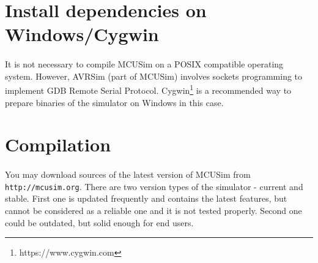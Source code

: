 \section{Install dependencies on Windows/Cygwin}
\paragraph{}
It is not necessary to compile MCUSim on a POSIX compatible operating system.
However, AVRSim (part of MCUSim) involves sockets programming to implement
GDB Remote Serial Protocol. Cygwin\footnote{https://www.cygwin.com} is a
recommended way to prepare binaries of the simulator on Windows in this case.

\section{Compilation}
\paragraph{}
You may download sources of the latest version of MCUSim from
\lstinline|http://mcusim.org|. There are two version types of the simulator -
current and stable. First one is updated frequently and contains the latest
features, but cannot be considered as a reliable one and it is not tested
properly. Second one could be outdated, but solid enough for end users.
